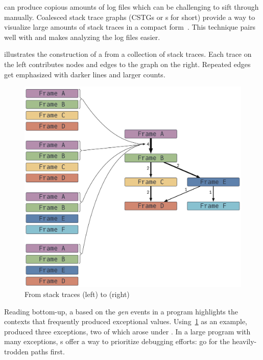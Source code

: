 \documentclass{juliacon}
\begin{document}
\FT{} can produce copious amounts of log files which can be challenging to sift through manually.
Coalesced stack trace graphs (CSTGs or \CSTG{}s for short) provide a way to visualize large amounts of stack traces in a compact form~\cite{humphreySystematicDebuggingMethods2014}.
This technique pairs well with \FT{} and makes analyzing the log files easier.

 illustrates the construction of a \CSTG{} from a collection of stack traces.
Each trace on the left contributes nodes and edges to the graph on the right.
Repeated edges get emphasized with darker lines and larger counts.

\begin{figure}[t]
  \centering
  \includegraphics[width=0.9\columnwidth]{./fig/cstg_static_diagram.pdf}
  \caption{From stack traces (left) to \CSTG{} (right)}
  \label{fig:cstg_demo}
\end{figure}

Reading bottom-up, a \CSTG{} based on the \emph{gen} events in a program
highlights the contexts that frequently produced exceptional values.
Using~\cref{fig:cstg_demo} as an example,  produced
three exceptions, two of which arose under .
In a large program with many exceptions, \CSTG{}s offer a way to prioritize
debugging efforts: go for the heavily-trodden paths first.


\subsection{\GPUFPX{}}
\label{s:gpufpx}
\end{document}
